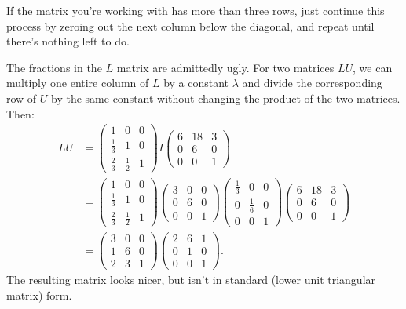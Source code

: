 If the matrix you're working with has more than three rows, just continue this process by zeroing out the next column below the diagonal, and repeat until there's nothing left to do.


The fractions in the $L$ matrix are admittedly ugly.  For two matrices $LU$, we can multiply one entire column of $L$ by a constant $\lambda$ and divide the corresponding row of $U$ by the same constant without changing the product of the two matrices.  Then:
\begin{align*}
LU &= \begin{pmatrix}
1 & 0 & 0 \\[1mm]
\frac{1}{3} & 1 & 0 \\[1mm]
\frac{2}{3} & \frac{1}{2} & 1 
\end{pmatrix}
I
\begin{pmatrix}
6 & 18 & 3 \\[1mm]
0 & 6 & 0 \\[1mm]
0 & 0 & 1 
\end{pmatrix} \\
&=
\begin{pmatrix}
1 & 0 & 0 \\[1mm]
\frac{1}{3} & 1 & 0 \\[1mm]
\frac{2}{3} & \frac{1}{2} & 1 
\end{pmatrix}
\begin{pmatrix}
3 & 0 & 0 \\
0 & 6 & 0 \\
0 & 0 & 1 
\end{pmatrix}
\begin{pmatrix}
\frac{1}{3} & 0 & 0 \\[1mm]
0 & \frac{1}{6} & 0 \\[1mm]
0 & 0 & 1 
\end{pmatrix}
\begin{pmatrix}
6 & 18 & 3 \\
0 & 6 & 0 \\
0 & 0 & 1 
\end{pmatrix} \\
&=
\begin{pmatrix}
3 & 0 & 0 \\
1 & 6 & 0 \\
2 & 3 & 1 
\end{pmatrix}\begin{pmatrix}
2 & 6 & 1 \\
0 & 1 & 0 \\
0 & 0 & 1 
\end{pmatrix}.
\end{align*}
The resulting matrix looks nicer, but isn't in standard (lower unit triangular matrix) form.

